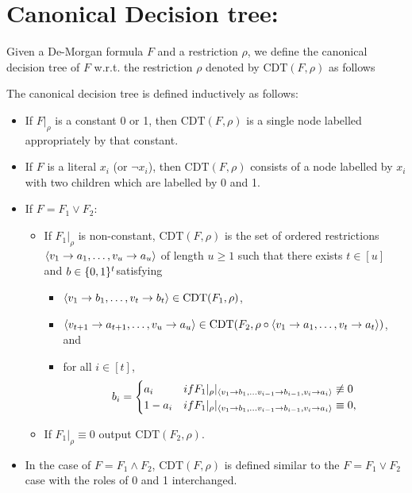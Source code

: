 \documentclass{article}
\newcommand{\cdt}{\mathrm{CDT}}
\begin{document}
\section{Canonical Decision tree:}    
    Given a De-Morgan formula $F$ and a restriction $\rho$, we define the canonical decision tree of $F$ w.r.t. the restriction $\rho$ denoted by $\cdt(F,\rho)$ as follows
    \begin{definition}[$\cdt(F,\rho)$:]
        The canonical decision tree is defined inductively as follows:
        \begin{itemize}
            \item If $F|_\rho$ is a constant 0 or 1, then $\cdt(F,\rho)$ is a single node labelled appropriately by that constant.
            \item If $F$ is a literal $x_i$ (or $\lnot x_i$), then $\cdt(F,\rho)$ consists of a node labelled by $x_i$  with two children which are labelled by 0 and 1.
            \item If $F = F_1 \vee F_2$:
                \begin{itemize}
                    \item If $F_1|_\rho$ is non-constant,
                    $\cdt(F,\rho)$ is the set of ordered restrictions $\left\langle v_1 \to a_1, \dots ,v_u \to a_u\right\rangle$ of length $u \geq 1$ such that 
                    there exists $t \in [u]$ and $b \in \{0,1\}^{t}$satisfying 
                    \begin{itemize}
                        \item $\abra{v_1 \to b_1,\dots ,v_t \to b_t} \in \cdt(F_1,\rho)$,
                        \item $\abra{v_{t+1} \to a_{t+1}, \dots , v_u \to a_u} \in \cdt(F_2, \rho\circ \abra{v_1 \to a_1, \dots , v_t\to a_t})$, and 
                        \item for all $i \in [t]$,
                        $$b_i = \begin{cases}
                                a_i & if F_1|_{\rho}|_{\left\langle v_1 \to b_1, \dots v_{i-1} \to b_{i-1},v_i \to a_i\right\rangle} \not\equiv 0\\
                                1-a_i & if F_1|_{\rho}|_{\left\langle v_1 \to b_1, \dots v_{i-1} \to b_{i-1},v_i \to a_i\right\rangle} \equiv 0,
                        \end{cases}
                        $$
                    \end{itemize}
                    \item If $F_1|_\rho \equiv 0$ output $\cdt(F_2,\rho)$.  
                \end{itemize}             
            \item In the case of $F = F_1 \wedge F_2$,  $\cdt(F,\rho)$ is defined similar to the $F= F_1 \vee F_2$ case with the roles of 0 and 1 interchanged. 
        \end{itemize}    
    \end{definition}   
\end{document}
